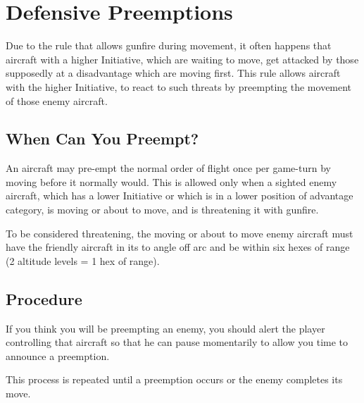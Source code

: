 \section{Defensive Preemptions}
\label{rule:defensive-preemptions}

Due to the rule that allows gunfire during movement, it often happens that aircraft with a higher Initiative, which are waiting to move, get attacked by those supposedly at a disadvantage which are moving first. This rule allows aircraft with the higher Initiative, to react to such threats by preempting the movement of those enemy aircraft.

\subsection{When Can You Preempt?} An aircraft may pre-empt the normal order of flight once per game-turn by moving before it normally would. This is allowed only when a sighted enemy aircraft, which has a lower Initiative or which is in a lower position of advantage category, is moving or about to move, and is threatening it with gunfire.

To be considered threatening, the moving or about to move enemy aircraft must have the friendly aircraft in its  to  angle off arc and be within six hexes of range (2 altitude levels = 1 hex of range).

\subsection{Procedure} If you think you will be preempting an enemy, you should alert the player controlling that aircraft so that he can pause momentarily  to allow you time to announce a preemption. 

  This process is repeated until a preemption occurs or the enemy completes its move.

